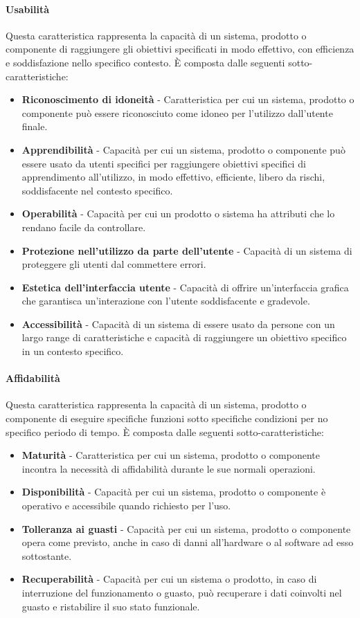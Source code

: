 \paragraph{Usabilità}
Questa caratteristica rappresenta la capacità di un sistema, prodotto o componente di raggiungere gli obiettivi specificati in modo effettivo, con efficienza e soddisfazione nello specifico contesto. È composta dalle seguenti sotto-caratteristiche:
\begin{itemize}
\item \textbf{Riconoscimento di idoneità} - Caratteristica per cui un sistema, prodotto o componente può essere riconosciuto come idoneo per l'utilizzo dall'utente finale.
\item \textbf{Apprendibilità} - Capacità per cui un sistema, prodotto o componente può essere usato da utenti specifici per raggiungere obiettivi specifici di apprendimento all'utilizzo, in modo effettivo, efficiente, libero da rischi, soddisfacente nel contesto specifico.
\item \textbf{Operabilità} - Capacità per cui un prodotto o sistema ha attributi che lo rendano facile da controllare. 
\item \textbf{Protezione nell'utilizzo da parte dell'utente} -  Capacità di un sistema di proteggere gli utenti dal commettere errori.
\item \textbf{Estetica dell'interfaccia utente} -  Capacità di offrire un'interfaccia grafica che garantisca un'interazione con l'utente soddisfacente e gradevole.
\item \textbf{Accessibilità} -  Capacità di un sistema di essere usato da persone con un largo range di caratteristiche e capacità di raggiungere un obiettivo specifico in un contesto specifico.
\end{itemize}

\paragraph{Affidabilità}
Questa caratteristica rappresenta la capacità di un sistema, prodotto o componente di eseguire specifiche funzioni sotto specifiche condizioni per no specifico periodo di tempo. È composta dalle seguenti sotto-caratteristiche:
\begin{itemize}
\item \textbf{Maturità} - Caratteristica per cui un sistema, prodotto o componente incontra la necessità di affidabilità durante le sue normali operazioni.
\item \textbf{Disponibilità} - Capacità per cui un sistema, prodotto o componente è operativo e accessibile quando richiesto per l'uso.
\item \textbf{Tolleranza ai guasti} - Capacità per cui un sistema, prodotto o componente opera come previsto, anche in caso di danni all'hardware o al software ad esso sottostante.
\item \textbf{Recuperabilità} - Capacità per cui un sistema o prodotto, in caso di interruzione del funzionamento o guasto, può recuperare i dati coinvolti nel guasto e ristabilire il suo stato funzionale.
\end{itemize}

